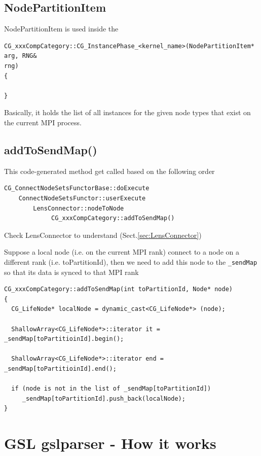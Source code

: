 \subsection{NodePartitionItem}
\label{sec:NodePartitionItem}

NodePartitionItem is used inside the 
\begin{verbatim}
CG_xxxCompCategory::CG_InstancePhase_<kernel_name>(NodePartitionItem* arg, RNG&
rng) 
{

}
\end{verbatim}

Basically, it holds the list of all instances for the given node types that
exist on the current MPI process.

\subsection{addToSendMap()}
\label{sec:addToSendMap()}

This code-generated method get called based on the following order
\begin{verbatim}
CG_ConnectNodeSetsFunctorBase::doExecute
    ConnectNodeSetsFunctor::userExecute
        LensConnector::nodeToNode 
             CG_xxxCompCategory::addToSendMap()
\end{verbatim}

Check LensConnector to understand (Sect.\ref{sec:LensConnector})

Suppose a local node (i.e. on the current MPI rank) connect to a node on a
different rank (i.e. toPartitionId), then we need to add this node to the
\verb!_sendMap! so that its data is synced to that MPI rank
\begin{verbatim}
CG_xxxCompCategory::addToSendMap(int toPartitionId, Node* node)
{
  CG_LifeNode* localNode = dynamic_cast<CG_LifeNode*> (node);
  
  ShallowArray<CG_LifeNode*>::iterator it = _sendMap[toPartitioinId].begin();
  
  ShallowArray<CG_LifeNode*>::iterator end = _sendMap[toPartitioinId].end();
  
  if (node is not in the list of _sendMap[toPartitionId])
     _sendMap[toPartitionId].push_back(localNode);
}
\end{verbatim}


\section{GSL gslparser - How it works}
\label{sec:GSL-how-it-works}

